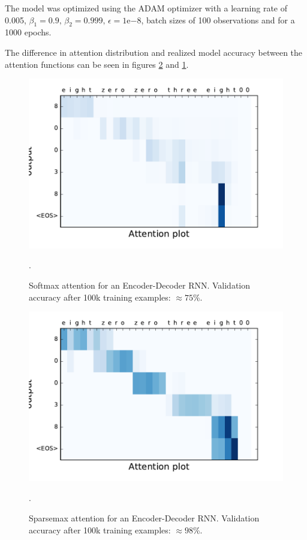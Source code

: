 The model was optimized using the ADAM optimizer with a learning rate of 0.005, $\beta_1=0.9, \, \beta_2 = 0.999, \, \epsilon = 1\mathrm{e}{-8}$, batch sizes of 100 observations and for a 1000 epochs.

The difference in attention distribution and realized model accuracy between the attention functions can be seen in figures \ref{fig:sparsemax} and \ref{fig:softmax}.
\begin{figure}[H]
	\centering
	\includegraphics[scale=0.5]{figures/attention_softmax.pdf}
	\caption{Softmax attention for an Encoder-Decoder RNN. Validation accuracy after 100k training examples: $\approx 75$\%.}
	\label{fig:softmax}.
\end{figure}
\begin{figure}[H]
 	\centering
 	\includegraphics[scale=0.5]{figures/attention_sparsemax.pdf}
 	\caption{Sparsemax attention for an Encoder-Decoder RNN. Validation accuracy after 100k training examples: $\approx 98$\%.}
 	\label{fig:sparsemax}.
\end{figure}
  

